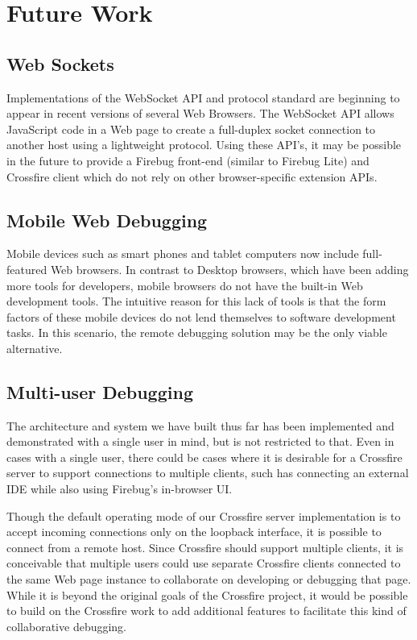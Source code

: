 \section {Future Work}
\subsection {Web Sockets}
Implementations of the WebSocket API\cite{websocketapi} and
protocol\cite{websocketprotocol} standard are beginning to appear in recent
versions of several Web Browsers. The WebSocket API allows JavaScript code in a
Web page to create a full-duplex socket connection to another host using a
lightweight protocol. Using these API's, it may be possible in the future to
provide a Firebug front-end (similar to Firebug Lite) and Crossfire client which
do not rely on other browser-specific extension APIs.
\subsection {Mobile Web Debugging}
Mobile devices such as smart phones and tablet computers now include
full-featured Web browsers. In contrast to Desktop browsers, which have
been adding more tools for developers, mobile browsers do not have the built-in
Web development tools. The intuitive reason for this lack of tools is that the
form factors of these mobile devices do not lend themselves to software
development tasks. In this scenario, the remote debugging solution may be the
only viable alternative.

\subsection {Multi-user Debugging}
The architecture and system we have built thus far has been implemented and
demonstrated with a single user in mind, but is not restricted to that. Even in
cases with a single user, there could be cases where it is desirable for a
Crossfire server to support connections to multiple clients, such has connecting
an external IDE while also using Firebug's in-browser UI.

Though the default operating mode of our Crossfire server implementation is to
accept incoming connections only on the loopback interface, it is possible to
connect from a remote host. Since Crossfire should support multiple clients, it
is conceivable that multiple users could use separate Crossfire clients
connected to the same Web page instance to collaborate on developing or
debugging that page. While it is beyond the original goals of the Crossfire
project, it would be possible to build on the Crossfire work to add additional
features to facilitate this kind of collaborative debugging.
